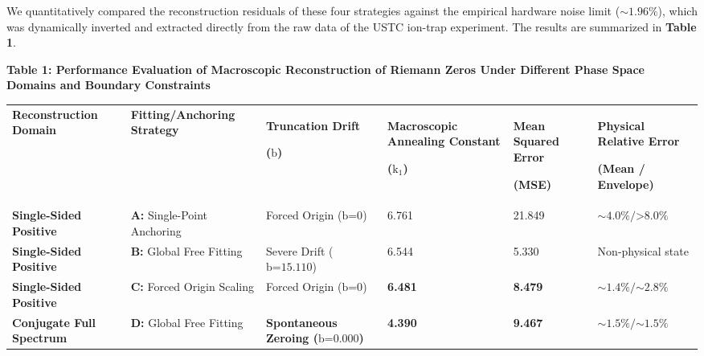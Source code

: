 We quantitatively compared the reconstruction residuals of these four
strategies against the empirical hardware noise limit
(\(\text{∼1.96\%}\)), which was dynamically inverted and extracted
directly from the raw data of the USTC ion-trap experiment. The results
are summarized in \textbf{Table 1}.

\textbf{Table 1: Performance Evaluation of Macroscopic Reconstruction of
Riemann Zeros Under Different Phase Space Domains and Boundary
Constraints}

\begin{longtable}[]{@{}llllll@{}}
\toprule
\endhead
\begin{minipage}[t]{0.14\columnwidth}\raggedright
\textbf{Reconstruction Domain}\strut
\end{minipage} & \begin{minipage}[t]{0.14\columnwidth}\raggedright
\textbf{Fitting/Anchoring Strategy}\strut
\end{minipage} & \begin{minipage}[t]{0.14\columnwidth}\raggedright
\textbf{Truncation Drift}

\textbf{(}\(\text{b}\)\textbf{)}\strut
\end{minipage} & \begin{minipage}[t]{0.14\columnwidth}\raggedright
\textbf{Macroscopic Annealing Constant}

\textbf{(}\(\text{k}_{\text{1}}\)\textbf{)}\strut
\end{minipage} & \begin{minipage}[t]{0.14\columnwidth}\raggedright
\textbf{Mean Squared Error}

\textbf{(MSE)}\strut
\end{minipage} & \begin{minipage}[t]{0.14\columnwidth}\raggedright
\textbf{Physical Relative Error}

\textbf{(Mean / Envelope)}\strut
\end{minipage}\tabularnewline
\textbf{Single-Sided Positive} & \textbf{A:} Single-Point Anchoring &
Forced Origin (\(\text{b}\text{=0}\)) & 6.761 & 21.849 &
\(\text{∼4.0\%/>8.0\%}\)\tabularnewline
\textbf{Single-Sided Positive} & \textbf{B:} Global Free Fitting &
Severe Drift (\(\text{b}\text{=15.110}\)) & 6.544 & 5.330 & Non-physical
state\tabularnewline
\textbf{Single-Sided Positive} & \textbf{C:} Forced Origin Scaling &
Forced Origin (\(\text{b}\text{=0}\)) & \textbf{6.481} & \textbf{8.479}
& \(\text{∼1.4\%/∼2.8\%}\)\tabularnewline
\textbf{Conjugate Full Spectrum} & \textbf{D:} Global Free Fitting &
\textbf{Spontaneous Zeroing (}\(\text{b}\text{=0.000}\)\textbf{)} &
\textbf{4.390} & \textbf{9.467} &
\(\text{∼1.5\%/∼1.5\%}\)\tabularnewline
\bottomrule
\end{longtable}


